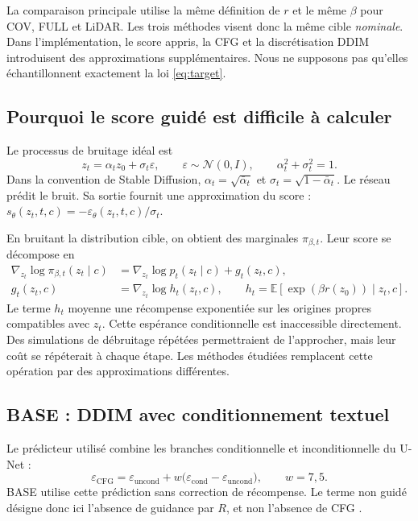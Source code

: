 \documentclass[11pt,a4paper]{article}
\newcommand{\E}{\mathbb{E}}
\begin{document}
La comparaison principale utilise la même définition de $r$ et le même $\beta$ pour COV, FULL et LiDAR. Les trois méthodes visent donc la même cible \emph{nominale}. Dans l'implémentation, le score appris, la CFG et la discrétisation DDIM introduisent des approximations supplémentaires. Nous ne supposons pas qu'elles échantillonnent exactement la loi \eqref{eq:target}.

\subsection{Pourquoi le score guidé est difficile à calculer}
Le processus de bruitage idéal est
\begin{equation}
z_t=\alpha_tz_0+\sigma_t\varepsilon,\qquad
\varepsilon\sim\mathcal N(0,I),\qquad \alpha_t^2+\sigma_t^2=1.
\end{equation}
Dans la convention de Stable Diffusion, $\alpha_t=\sqrt{\bar\alpha_t}$ et $\sigma_t=\sqrt{1-\bar\alpha_t}$. Le réseau prédit le bruit. Sa sortie fournit une approximation du score : $s_\theta(z_t,t,c)=-\varepsilon_\theta(z_t,t,c)/\sigma_t$.

En bruitant la distribution cible, on obtient des marginales $\pi_{\beta,t}$. Leur score se décompose en
\begin{align}
\nabla_{z_t}\log\pi_{\beta,t}(z_t\mid c)
&=\nabla_{z_t}\log p_t(z_t\mid c)+g_t(z_t,c),\label{eq:score}\\
g_t(z_t,c)&=\nabla_{z_t}\log h_t(z_t,c),\qquad
h_t=\E\!\left[\exp(\beta r(z_0))\mid z_t,c\right].\label{eq:tilt}
\end{align}
Le terme $h_t$ moyenne une récompense exponentiée sur les origines propres compatibles avec $z_t$. Cette espérance conditionnelle est inaccessible directement. Des simulations de débruitage répétées permettraient de l'approcher, mais leur coût se répéterait à chaque étape. Les méthodes étudiées remplacent cette opération par des approximations différentes.

\subsection{BASE : DDIM avec conditionnement textuel}
Le prédicteur utilisé combine les branches conditionnelle et inconditionnelle du U-Net :
\begin{equation}\label{eq:cfg}
\varepsilon_{\mathrm{CFG}}
=\varepsilon_{\mathrm{uncond}}
+w\bigl(\varepsilon_{\mathrm{cond}}-\varepsilon_{\mathrm{uncond}}\bigr),
\qquad w=7{,}5.
\end{equation}
BASE utilise cette prédiction sans correction de récompense. Le terme \og non guidé\fg{} désigne donc ici l'absence de guidance par $R$, et non l'absence de CFG \cite{cfg}.
\end{document}
